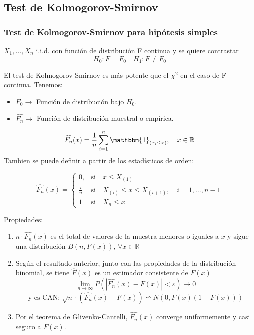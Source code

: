 \subsection{Test de Kolmogorov-Smirnov}
\subsubsection{Test de Kolmogorov-Smirnov para hipótesis simples}

$X_1,\dots, X_n$ i.i.d. con función de distribución F continua y se quiere contrastar
\[
    H_0: F=F_0 \quad H_1: F \neq F_0
\]

El test de Kolmogorov-Smirnov es más potente que el $\chi^2$ en el caso de F continua.
Tenemos:
\begin{itemize}
    \item $F_0 \to $ Función de distribución bajo $H_0$.
    \item $\widehat{F_n} \to$ Función de distribución muestral o empírica.
\end{itemize}
\[
    \widehat{F_n}(x)=\frac{1}{n} \sum_{i=1}^{n} \mathbbm{1}_{(x_i \leq x)}, \quad x \in \mathbb{R}
\]
Tambien se puede definir a partir de los estadísticos de orden:

\[
    \widehat{F_n}(x)=
    \left\{
    \begin{array}{ll}
        0, & \text{si} \quad x \leq X_{(1)}\\
        \frac{i}{n} & \text{si} \quad X_{(i)} \leq x \leq X_{(i+1)}, \quad i=1, \dots,n-1 \\
        1 & \text{si} \quad X_n \leq x
    \end{array}
    \right.
\]
\newpage

Propiedades:
\begin{enumerate}
    \item $n\cdot \widehat{F_n}(x)$ es el total de valores de la muestra menores o iguales a $x$ y sigue una distribución $B(n, F(x))$, $\forall x \in \mathbb{R}$
    \item Según el resultado anterior, junto con las propiedades de la distribución binomial, se tiene $\widehat{F}(x)$ es un estimador consistente de $F(x)$
    \[
        \lim_{n \to \infty} P(|\widehat{F_n}(x) - F(x)| < \varepsilon) \to 0
    \]
    \[
        \text{y es CAN: }\sqrt{n}\cdot(\widehat{F_n}(x)-F(x))\backsimeq N(0,F(x)(1-F(x)))
    \]
    \item Por el teorema de Glivenko-Cantelli, $\widehat{F_n}(x)$ converge uniformemente y casi seguro a $F(x)$.
\end{enumerate}

